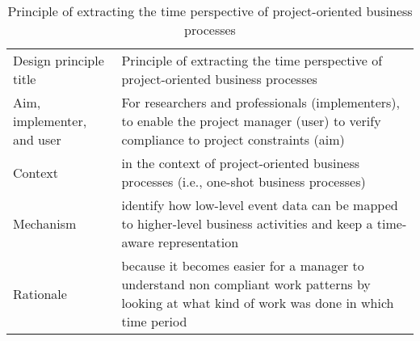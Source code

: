 \begin{table}[]
	\caption{Principle of extracting the time perspective of project-oriented business processes}
	\label{tab:time-principle}
	\begin{tabular}{@{}ll@{}}
		Design principle title     & {Principle of extracting the time perspective of project-oriented business processes}                                                             \\
		Aim, implementer, and user & {For researchers and professionals (implementers), to enable the project manager (user) to verify compliance to project constraints (aim)}        \\
		Context                    & {in the context of project-oriented business processes (i.e., one-shot business processes)}                                                       \\
		Mechanism                  & {identify how low-level event data can be mapped to higher-level business activities and keep a time-aware representation}                        \\
		Rationale                  & {because it becomes easier for a manager to understand non compliant work patterns by looking at what kind of work was done in which time period}
	\end{tabular}
\end{table}